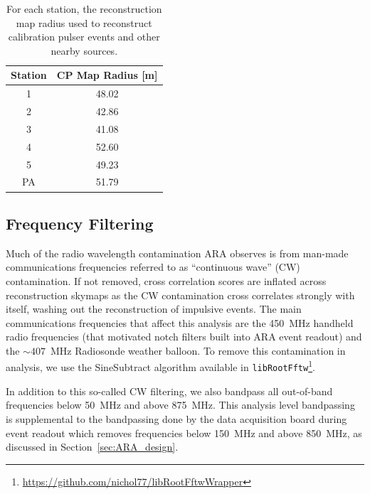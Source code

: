     \begin{table}
      \centering
      \begin{tabular}{| c | c |}
        \hline
        Station & CP Map Radius [m] \\
        \hline
        1 & 48.02 \\
        2 & 42.86 \\
        3 & 41.08 \\
        4 & 52.60 \\
        5 & 49.23 \\
        PA & 51.79 \\
        \hline
      \end{tabular}
      \caption{
        For each station, the reconstruction map radius used to reconstruct calibration pulser events and other nearby sources.
      }
      \label{tab:cpdist}
    \end{table}

  \subsection{Frequency Filtering\label{sec:freq_filtering}}
    
    Much of the radio wavelength contamination ARA observes is from man-made communications frequencies referred to as ``continuous wave'' (CW) contamination. 
    If not removed, cross correlation scores are inflated across reconstruction skymaps as the CW contamination cross correlates strongly with itself, washing out the reconstruction of impulsive events. 
    The main communications frequencies that affect this analysis are the 450~MHz handheld radio frequencies (that motivated notch filters built into ARA event readout) and the $\sim \! 407$~MHz Radiosonde weather balloon.
    To remove this contamination in analysis, we use the SineSubtract algorithm available in \texttt{libRootFftw}\footnote{\url{https://github.com/nichol77/libRootFftwWrapper}}.

    In addition to this so-called CW filtering, we also bandpass all out-of-band frequencies below 50~MHz and above 875~MHz.
    This analysis level bandpassing is supplemental to the bandpassing done by the data acquisition board during event readout which removes frequencies below 150~MHz and above 850~MHz, as discussed in Section~\ref{sec:ARA_design}.
  
